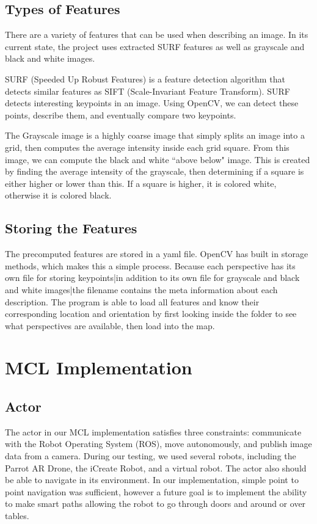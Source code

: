 \documentclass[a4paper,11pt]{article}
\begin{document}
  \subsection{Types of Features}
There are a variety of features that can be used when describing an image. In its current state, the project uses extracted SURF features as well as grayscale and black and white images.

SURF (Speeded Up Robust Features) is a feature detection algorithm that detects similar features as SIFT (Scale-Invariant Feature Transform). SURF detects interesting keypoints in an image. Using OpenCV, we can detect these points, describe them, and eventually compare two keypoints.

The Grayscale image is a highly coarse image that simply splits an image into a grid, then computes the average intensity inside each grid square. From this image, we can compute the black and white ``above below" image. This is created by finding the average intensity of the grayscale, then determining if a square is either higher or lower than this. If a square is higher, it is colored white, otherwise it is colored black.

  \subsection{Storing the Features}
The precomputed features are stored in a yaml file. OpenCV has built in storage methods, which makes this a simple process. Because each perspective has its own file for storing keypoints|in addition to its own file for grayscale and black and white images|the filename contains the meta information about each description. The program is able to load all features and know their corresponding location and orientation by first looking inside the folder to see what perspectives are available, then load into the map.

  \section{MCL Implementation}
   
 \subsection{Actor}
The actor in our MCL implementation satisfies three constraints: communicate with the Robot Operating System (ROS), move autonomously, and publish image data from a camera. During our testing, we used several robots, including the Parrot AR Drone, the iCreate Robot, and a virtual robot. The actor also should be able to navigate in its environment. In our implementation, simple point to point navigation was sufficient, however a future goal is to implement the ability to make smart paths allowing the robot to go through doors and around or over tables.
\end{document}
